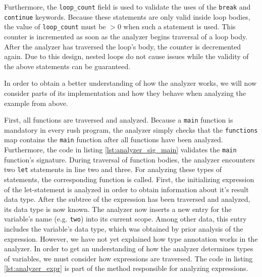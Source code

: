 
Furthermore, the \texttt{loop\_count} field is used to validate the uses of the \texttt{break} and \texttt{continue} keywords.
Because these statements are only valid inside loop bodies, the value of \texttt{loop\_count} must be $> 0$ when such a statement is used.
This counter is incremented as soon as the analyzer begins traversal of a loop body.
After the analyzer has traversed the loop's body, the counter is decremented again.
Due to this design, nested loops do not cause issues while the validity of the above statements can be guaranteed.

In order to obtain a better understanding of how the analyzer works, we will now
consider parts of its implementation and how they behave when analyzing the
example from above.

First, all functions are traversed and analyzed.
Because a \texttt{main} function is mandatory in every rush program,
the analyzer simply checks that the \texttt{functions} map contains the \texttt{main} function after all functions have been analyzed.
Furthermore, the code in listing \ref{lst:analyzer_sig_main} validates the \texttt{main} function's signature.
During traversal of function bodies, the analyzer encounters two \texttt{let} statements in line two and three.
For analyzing these types of statements, the corresponding function is called.
First, the initializing expression of the let-statement is analyzed in order to obtain information about it's result data type.
After the subtree of the expression has been traversed and analyzed, its data type is now known.
The analyzer now inserts a new entry for the variable's name (e.g. \texttt{two}) into its current scope.
Among other data, this entry includes the variable's data type, which was obtained by prior analysis of the expression.
However, we have not yet explained how type annotation works in the analyzer.
In order to get an understanding of how the analyzer determines types of variables, we must consider how expressions are traversed.
The code in listing \ref{lst:analyzer_expr} is part of the method responsible for analyzing expressions.


